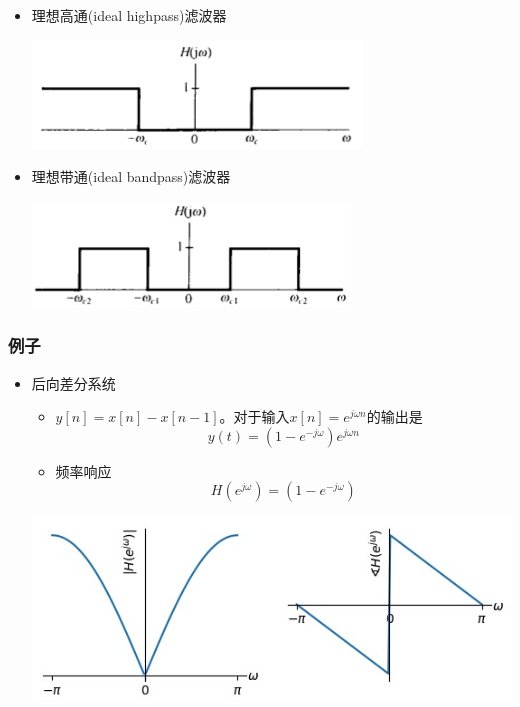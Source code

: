 \documentclass[CJKutf8,xcolor=pdftex,dvipsnames,table]{beamer}
\begin{document}
\begin{CJK*}{UTF8}{song}
\begin{frame}
\begin{itemize}
\begin{itemize}
    	\item 理想高通(ideal highpass)滤波器
     		\begin{center}
      		\includegraphics[scale=.4]{ss-c-f3-27a}
    		\end{center}   
    
    	\item 理想带通(ideal bandpass)滤波器
     		\begin{center}
      		\includegraphics[scale=.4]{ss-c-f3-27b}
    		\end{center}   
	
    	\end{itemize}
    \end{itemize}
  \end{frame}   
  
  \begin{frame}
    \frametitle{例子}
    \begin{itemize}
    \item 后向差分系统
    	\begin{itemize}
		\item $y[n]=x[n]-x[n-1]$。对于输入$x[n]=e^{j\omega n}$的输出是 \[ y(t)=(1-e^{-j\omega}) e^{j\omega n} \]
		\item 频率响应 \[ H(e^{j\omega})=(1-e^{-j\omega}) \]
		\end{itemize}
    \begin{center}
      \includegraphics[scale=.4]{freqrespdiff}
    \end{center}
    \end{itemize}
  \end{frame}  
    

\end{CJK*}
\end{document}
